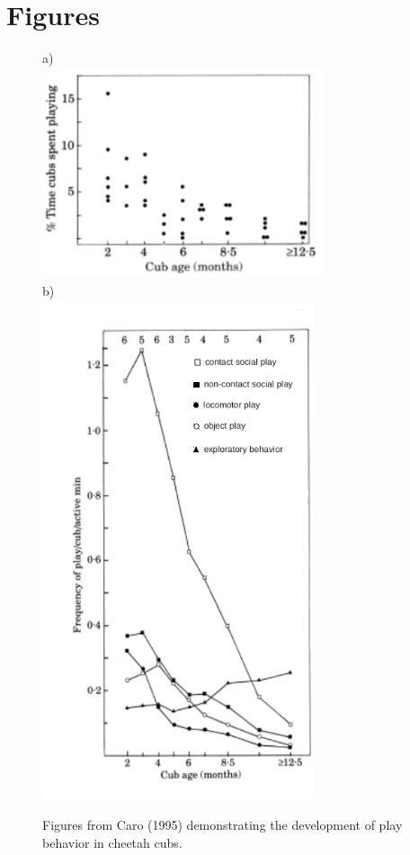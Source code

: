 \documentclass[12pt,letterpaper]{article}
\begin{document}

\clearpage
\section{Figures}

	\begin{figure}[h!]
	\caption{Figures from Caro (1995) demonstrating the development of play behavior in cheetah cubs.}
	  \begin{center}
	    \begin{minipage}[t]{0.49\linewidth}
	      a)\\
	      \includegraphics[width=83mm]{caroFig1edit.pdf}\\
	      b)\\
	      \includegraphics[width=80mm]{caroFig2edit.pdf}

\end{minipage}
\end{center}
\end{figure}
\end{document}
